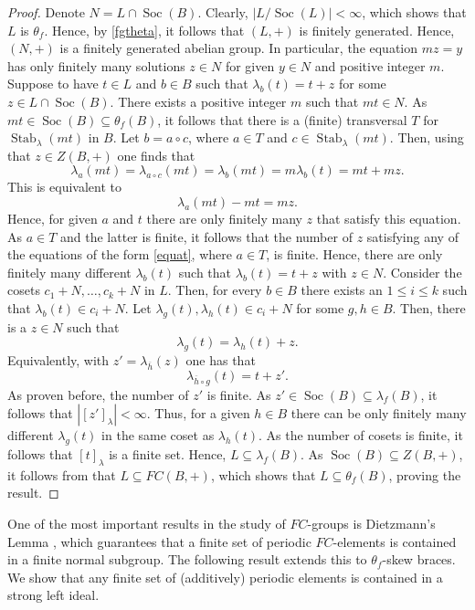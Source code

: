 \documentclass{amsart}
\newcommand{\Soc}{\operatorname{Soc}}
\newcommand{\Stab}{\operatorname{Stab}}
\begin{document}
\begin{proof}
    Denote $N=L \cap \Soc(B)$. Clearly, $|L/\Soc(L)|<\infty$, which shows that $L$ is $\theta_f$. Hence, by \cref{fgtheta}, it follows that $(L,+)$ is finitely generated. Hence, $(N,+)$ is a finitely generated abelian group. In particular, the equation $mz = y$ has only finitely many solutions $z \in N$ for given $y \in N$ and positive integer $m$.
    Suppose to have $t \in L$ and $b \in B$ such that $\lambda_b(t) =t +z$ for some $z \in L\cap \Soc(B)$. There exists a positive integer $m$ such that $mt \in N$. As $mt \in \Soc(B)\subseteq \theta_f(B)$, it follows that there is a (finite) transversal $T$ for $\Stab_{\lambda}(mt)$ in $B$. Let $b = a \circ c$, where $a \in T$ and $c \in \Stab_{\lambda}(mt)$. Then, using that $z \in Z(B,+)$ one finds that
    $$ \lambda_a(mt)=\lambda_{a \circ c}(mt) = \lambda_{b}(mt) =m\lambda_{b}(t)=mt+mz.$$ 
    This is equivalent to \begin{equation}\label{equat}
        \lambda_a(mt)-mt = mz.
    \end{equation}
    Hence, for given $a$ and $t$ there are only finitely many $z$ that satisfy this equation. As $a \in T$ and the latter is finite, it follows that the number of $z$ satisfying any of the equations of the form \eqref{equat}, where $a \in T$, is finite. Hence, there are only finitely many different $\lambda_b(t)$ such that $\lambda_b(t) =t+z$ with $z \in N$. 
    Consider the cosets $c_1+N,\dots, c_k+N$ in $L$. Then, for every $b \in B$ there exists an $1\leq i \le k$ such that $\lambda_b(t) \in c_i+N$. 
    Let $\lambda_g(t),\lambda_h(t) \in c_i +N$ for some $g,h \in B$. Then, there is a $z \in N$ such that $$ \lambda_g(t) =\lambda_h(t) +z.$$ Equivalently, with $z'=\lambda_{\overline{h}}(z)$ one has that $$ \lambda_{\overline{h}\circ g}(t) =t+z'.$$ 
    As proven before, the number of $z'$ is finite. As $z' \in \Soc(B) \subseteq \lambda_f(B)$, it follows that $|[z']_{\lambda}|<\infty$. Thus, for a given $h \in B$ there can be only finitely many different $\lambda_g(t)$ in the same coset as $\lambda_h(t)$.  As the number of cosets is finite, it follows that $[t]_{\lambda}$ is a finite set. Hence, $L \subseteq \lambda_f(B)$.
    As $\Soc(B) \subseteq Z(B,+)$, it follows from \cite[Lemma 4]{FC} that $L \subseteq FC(B,+)$, which shows that $L \subseteq \theta_f(B)$, proving the result.
\end{proof}


One of the most important results in the study of $FC$-groups is Dietzmann’s Lemma \cite[Result 14.5.7]{robinson2}, which guarantees that a finite set of periodic $FC$-elements is contained in a finite normal subgroup. The following result extends this to  $\theta_f$-skew braces. We show that any finite set of (additively) periodic elements is contained in a strong left ideal.
\end{document}
